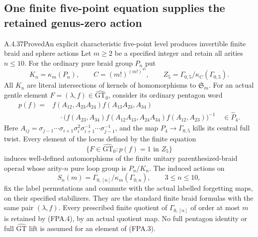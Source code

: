 \subsection{One finite five-point equation supplies the retained genus-zero action}

\begin{result}{A.4.37}{Proved}{An explicit characteristic five-point level produces invertible finite braid and sphere actions}
Let $m\geq2$ be a specified integer and retain all arities
$n\leq10$.  For the ordinary pure braid group $P_n$ put
\[
 K_n=\kappa_m(P_n),\qquad
 C=(m!)^{(m!)^{45}},\qquad
 Z_5=\Gamma_{0,5}/\kappa_C(\Gamma_{0,5}).                \tag{FPA.1}
\]
All $K_n$ are literal intersections of kernels of
homomorphisms to $\mathfrak S_m$.
For an actual gentle element $F=(\lambda,f)\in\widehat{\mathrm{GT}}_0$,
consider its ordinary pentagon word
\[
\begin{split}
 p(f)={}&f(A_{12},A_{23}A_{24})f(A_{13}A_{23},A_{34})\\
 &\quad\cdot
 \bigl(f(A_{23},A_{34})f(A_{12}A_{13},A_{24}A_{34})
                                      f(A_{12},A_{23})\bigr)^{-1}
                  \quad\in\widehat P_4.
\end{split}                                                    \tag{FPA.2}
\]
Here $A_{ij}=\sigma_{j-1}\cdots\sigma_{i+1}\sigma_i^2
\sigma_{i+1}^{-1}\cdots\sigma_{j-1}^{-1}$, and the map
$P_4\to\Gamma_{0,5}$ kills its central full twist.
Every element of the locus defined by the finite equation
\[
 \{F\in\widehat{\mathrm{GT}}_0: p(f)=1\text{ in }Z_5\}
                                                               \tag{FPA.3}
\]
induces well-defined automorphisms of the finite
unitary parenthesized-braid operad whose arity-$n$ pure
loop group is $P_n/K_n$.  The induced actions on
\[
 S_n(m)=\Gamma_{0,[n]}/\kappa_m(\Gamma_{0,n}),
                    \qquad 3\leq n\leq10,             \tag{FPA.4}
\]
fix the label permutations and commute with the actual
labelled forgetting maps, on their specified stabilizers.
They are the standard finite braid formulas with the
same pair $(\lambda,f)$.  Every prescribed finite quotient
of $\Gamma_{0,[n]}$ of order at most $m$ is retained by
(FPA.4), by an actual quotient map.  No full pentagon
identity or full $\widehat{\mathrm{GT}}$ lift is assumed
for an element of (FPA.3).
\end{result}


